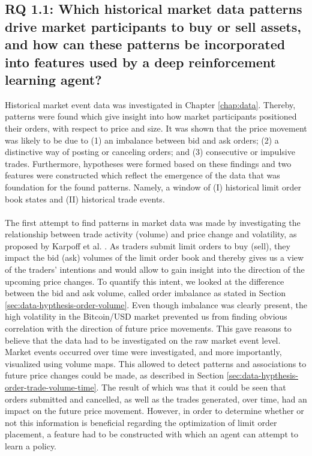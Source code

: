 \subsection{RQ 1.1: Which historical market data patterns drive market participants to buy or sell assets, and how can these patterns be incorporated into features used by a deep reinforcement learning agent?}

    Historical market event data was investigated in Chapter \ref{chap:data}. 
    Thereby, patterns were found which give insight into how market participants positioned their orders, with respect to price and size. 
    It was shown that the price movement was likely to be due to (1) an imbalance between bid and ask orders; (2) a distinctive way of posting or canceling orders; and (3) consecutive or impulsive trades.
    Furthermore, hypotheses were formed based on these findings and two features were constructed which reflect the emergence of the data that was foundation for the found patterns.
    Namely, a window of (I) historical limit order book states and (II) historical trade events.
    \\
    \\
The first attempt to find patterns in market data was made by investigating the relationship between trade activity (volume) and price change and volatility, as proposed by Karpoff et al. \cite{karpoff1987relation}.  
As traders submit limit orders to buy (sell), they impact the bid (ask) volumes of the  limit order book and thereby gives us a view of the traders’ intentions and would allow  to gain insight into the direction of the upcoming price changes.
To quantify this intent, we looked at the difference between the bid and ask volume, called order imbalance as stated in Section \ref{sec:data-hypthesis-order-volume}.
Even though imbalance was clearly present, the high volatility in the Bitcoin/USD market prevented us from finding obvious correlation with the direction of future price movements.
This gave reasons to believe that the data had to be investigated on the raw market event level\cite{kane2011analyzing}.
Market events occurred over time were investigated, and more importantly, visualized using volume maps.
This allowed to detect patterns and associations to future price changes could be made, as described in Section \ref{sec:data-hypthesis-order-trade-volume-time}.
The result of which was that it could be seen that orders submitted and cancelled, as well as the trades generated, over time, had an impact on the future price movement.
However, in order to determine whether or not this information is beneficial regarding the optimization of limit order placement, a feature had to be constructed with which an agent can attempt to learn a policy.
